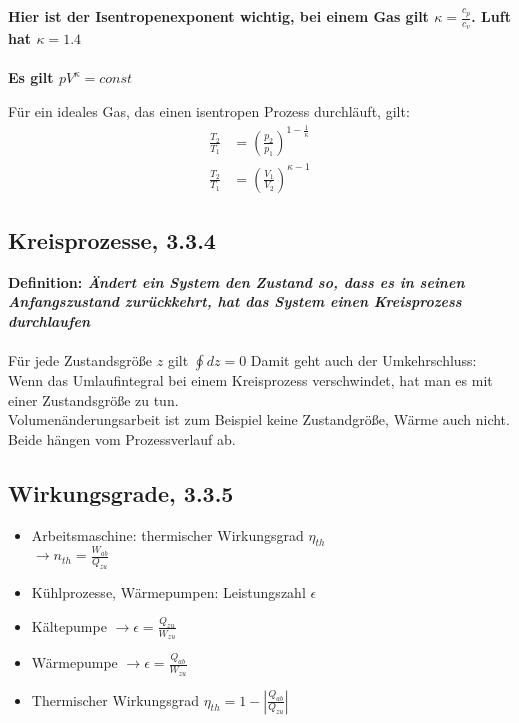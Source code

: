\documentclass[12pt]{article}
\begin{document}
\textbf{Hier ist der Isentropenexponent wichtig, bei einem Gas gilt $\kappa =\frac{c_p}{c_v}$. Luft hat $\kappa=1.4$ \\ \\
Es gilt $pV^\kappa=const$}
\begin{tcolorbox}[colback=backblue,colframe=borderblue,title=Important]
Für ein ideales Gas, das einen isentropen Prozess durchläuft, gilt:
\begin{align*}
\frac{T_2}{T_1}&=\left(\frac{p_2}{p_1}\right)^{1-\frac{1}{\kappa}}\\
\frac{T_2}{T_1}&=\left(\frac{V_1}{V_2}\right)^{\kappa-1}
\end{align*}
\end{tcolorbox}

\subsection{Kreisprozesse, 3.3.4}

\textbf{Definition: \textit{Ändert ein System den Zustand so, dass es in seinen Anfangszustand zurückkehrt, hat das System einen Kreisprozess durchlaufen}}\\
\\
Für jede Zustandsgröße $z$ gilt $\oint dz=0$
Damit geht auch der Umkehrschluss: Wenn das Umlaufintegral bei einem Kreisprozess verschwindet, hat man es mit einer Zustandsgröße zu tun. \\
Volumenänderungsarbeit ist zum Beispiel keine Zustandgröße, Wärme auch nicht. Beide hängen vom Prozessverlauf ab.

\subsection{Wirkungsgrade, 3.3.5}

\begin{itemize}
\item Arbeitsmaschine: thermischer Wirkungsgrad $\eta_{th}$ \\
$\rightarrow n_{th}=\frac{W_{ab}}{Q_{zu}}$
\item Kühlprozesse, Wärmepumpen: Leistungszahl $\epsilon$ \\
\item Kältepumpe $\rightarrow \epsilon = \frac{Q_{zu}}{W_{zu}}$
\item Wärmepumpe $\rightarrow \epsilon = \frac{Q_{ab}}{W_{zu}}$
\item Thermischer Wirkungsgrad $\eta_{th}=1-\left|\frac{Q_{ab}}{Q_{zu}}\right|$
\end{itemize}
\end{document}
